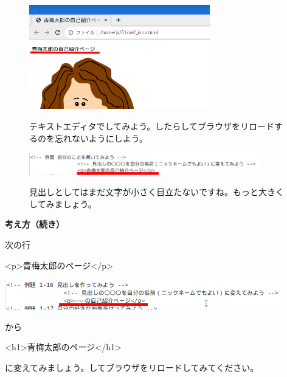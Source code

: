 \documentclass[a4paper,12pt]{jarticle}
\begin{document}
\begin{figure}[ht]
\begin{minipage}{\textwidth}
    \includegraphics[width=0.7\textwidth]{textbook-img154.png}


    \bigskip

    テキストエディタでしてみよう。したらしてブラウザをリロードするのを忘れないようにしよう。


    \bigskip

    \includegraphics[width=0.9\textwidth]{textbook-img155.png}


    \bigskip


    見出しとしてはまだ文字が小さく目立たないですね。もっと大きくしてみましょう。




    \bigskip
  \end{minipage}

\end{figure}

\clearpage
\flushleft
\textbf{考え方（続き）}




次の行

{\textless}p{\textgreater}青梅太郎のページ{\textless}/p{\textgreater}

\bigskip

\includegraphics[width=0.9\textwidth]{textbook-img158.png}

から

{\textless}h1{\textgreater}青梅太郎のページ{\textless}/h1{\textgreater}

に変えてみましょう。してブラウザをリロードしてみてください。
\end{document}
